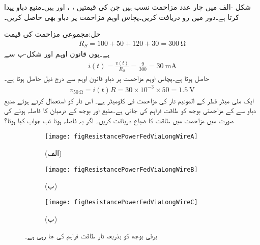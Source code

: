 شکل -الف میں چار عدد مزاحمت نسب ہیں جن کی قیمتیں ، ،  اور  ہیں۔منبع دباو  پیدا کرتا ہے۔دور میں رو دریافت کریں۔پچاس اوہم مزاحمت پر دباو بھی حاصل کریں۔

حل:مجموعی مزاحمت کی قیمت
\begin{align*}
R_S=100+50+120+30=\SI{300}{\ohm}
\end{align*}
ہے۔یوں قانون اوہم اور شکل-ب سے
\begin{align*}
i(t)=\frac{v(t)}{R_S}=\frac{9}{300}=\SI{30}{\milli\ampere}
\end{align*}
حاصل ہوتا ہے۔پچاس اوہم مزاحمت پر دباو قانون اوہم سے درج ذیل حاصل ہوتا ہے۔
\begin{align*}
v_{\SI{50}{\ohm}}=i(t) R = 30\times 10^{-3} \times 50=\SI{1.5}{\volt}
\end{align*}
\FloatBarrier
ایک ملی میٹر قطر کے المونیم تار کی مزاحمت  فی کلومیٹر ہے۔ اس تار کو استعمال کرتے ہوئے  منبع دباو سے  کے مزاحمتی بوجھ کو طاقت فراہم کی جاتی ہے۔منبع اور بوجھ کے درمیان  کا فاصلہ ہونے کی صورت میں مزاحمت میں طاقت کا ضیاع دریافت کریں۔ اگر یہ فاصلہ  ہوتا تب جواب کیا ہوتا؟ 

\begin{figure}
\centering
\begin{subfigure}{0.33\textwidth}
\centering
\texttt{[image: figResistancePowerFedViaLongWireA]}
\caption*{(الف)}
\end{subfigure}%
\begin{subfigure}{0.33\textwidth}
\centering
\texttt{[image: figResistancePowerFedViaLongWireB]}
\caption*{(ب)}
\end{subfigure}%
\begin{subfigure}{0.33\textwidth}
\centering
\texttt{[image: figResistancePowerFedViaLongWireC]}
\caption*{(پ)}
\end{subfigure}%
\caption{برقی بوجھ کو بذریعہ تار طاقت فراہم کی جا رہی ہے۔}
\label{شکل_مزاحمتی_فراہمی_طاقت_بذریعہ_تار}
\end{figure}

